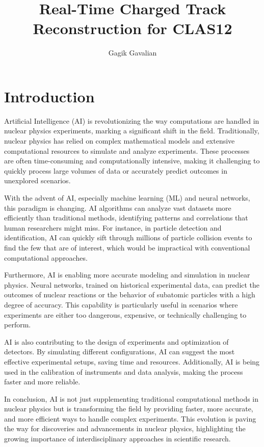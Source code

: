 \documentclass[a4paper,11pt]{article}
\title{Real-Time Charged Track Reconstruction for CLAS12}
\author[a,1]{Gagik Gavalian}
\affiliation[a]{Jefferson Lab, Newport News, VA, USA}
\begin{document}
\maketitle


\section{Introduction}
\indent
Artificial Intelligence (AI) is revolutionizing the way computations are handled in nuclear physics experiments, marking a significant shift in the field. Traditionally, nuclear physics has relied on complex mathematical models and extensive computational resources to simulate and analyze experiments. These processes are often time-consuming and computationally intensive, making it challenging to quickly process large volumes of data or accurately predict outcomes in unexplored scenarios.

With the advent of AI, especially machine learning (ML) and neural networks, this paradigm is changing. AI algorithms can analyze vast datasets more efficiently than traditional methods, identifying patterns and correlations that human researchers might miss. For instance, in particle detection and identification, AI can quickly sift through millions of particle collision events to find the few that are of interest, which would be impractical with conventional computational approaches.

Furthermore, AI is enabling more accurate modeling and simulation in nuclear physics. Neural networks, trained on historical experimental data, can predict the outcomes of nuclear reactions or the behavior of subatomic particles with a high degree of accuracy. This capability is particularly useful in scenarios where experiments are either too dangerous, expensive, or technically challenging to perform.

AI is also contributing to the design of experiments and optimization of detectors. By simulating different configurations, AI can suggest the most effective experimental setups, saving time and resources. Additionally, AI is being used in the calibration of instruments and data analysis, making the process faster and more reliable.

In conclusion, AI is not just supplementing traditional computational methods in nuclear physics but is transforming the field by providing faster, more accurate, and more efficient ways to handle complex experiments. This evolution is paving the way for discoveries and advancements in nuclear physics, highlighting the growing importance of interdisciplinary approaches in scientific research.
\end{document}
